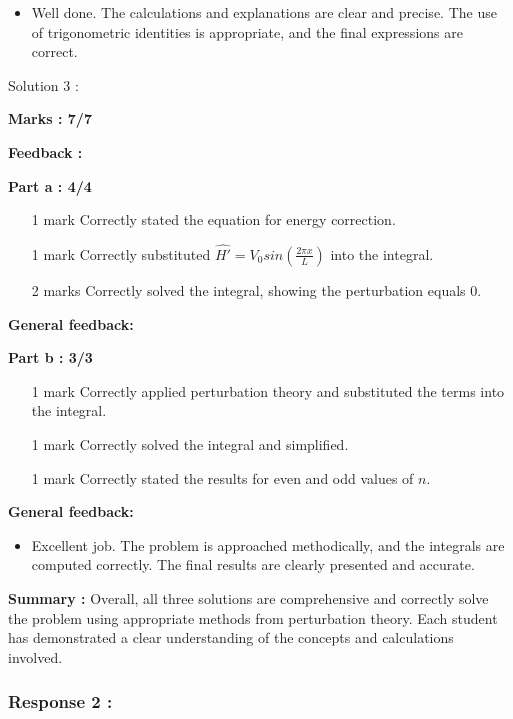 \documentclass[a4paper,11pt]{article}
\begin{document}
\begin{itemize}
    \item Well done. The calculations and explanations are clear and precise. The use of trigonometric identities is appropriate, and the final expressions are correct.
\end{itemize}



Solution 3 :

\textbf{Marks : 7/7}

\textbf{Feedback :}

\textbf{Part a : 4/4}

\begin{itemize}
    \item [1 mark] Correctly stated the equation for energy correction.
    \item [1 mark] Correctly substituted $\hat{H'} = V_{0}sin(\frac{2\pi x}{L})$ into the integral.
    \item [2 marks] Correctly solved the integral, showing the perturbation equals 0.
\end{itemize}

\textbf{General feedback:}


\textbf{Part b : 3/3}

\begin{itemize}
    \item [1 mark] Correctly applied perturbation theory and substituted the terms into the integral.
    \item [1 mark] Correctly solved the integral and simplified.
    \item [1 mark] Correctly stated the results for even and odd values of $n$.
\end{itemize}

\textbf{General feedback:}

\begin{itemize}
    \item Excellent job. The problem is approached methodically, and the integrals are computed correctly. The final results are clearly presented and accurate.
\end{itemize}

\textbf{Summary :}
Overall, all three solutions are comprehensive and correctly solve the problem using appropriate methods from perturbation theory. Each student has demonstrated a clear understanding of the concepts and calculations involved.



\subsubsection*{Response 2 :}
\end{document}
